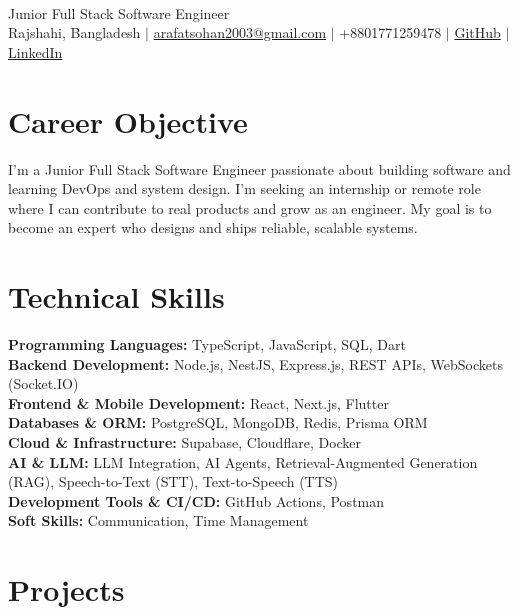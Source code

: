 \documentclass[11pt,a4paper]{article}
\newcommand{\rlink}[2]{\href{#1}{\textcolor{linkblue}{#2}}}
\begin{document}
\begin{center}
  {\LARGE\bfseries{}}\\[4pt]
  Junior Full Stack Software Engineer\\[4pt]
  Rajshahi, Bangladesh $|$ \rlink{mailto:arafatsohan2003@gmail.com}{arafatsohan2003@gmail.com} $|$ +8801771259478 $|$ \rlink{https://github.com/ars2k03}{GitHub} $|$ \rlink{https://www.linkedin.com/in/ars2k05}{LinkedIn}
\end{center}

\section{Career Objective}
I'm a Junior Full Stack Software Engineer passionate about building software and learning DevOps and system design. I'm seeking an internship or remote role where I can contribute to real products and grow as an engineer. My goal is to become an expert who designs and ships reliable, scalable systems.

\section{Technical Skills}
\textbf{Programming Languages:} TypeScript, JavaScript, SQL, Dart\\
\textbf{Backend Development:} Node.js, NestJS, Express.js, REST APIs, WebSockets (Socket.IO)\\
\textbf{Frontend \& Mobile Development:} React, Next.js, Flutter\\
\textbf{Databases \& ORM:} PostgreSQL, MongoDB, Redis, Prisma ORM\\
\textbf{Cloud \& Infrastructure:} Supabase, Cloudflare, Docker\\
\textbf{AI \& LLM:} LLM Integration, AI Agents, Retrieval-Augmented Generation (RAG), Speech-to-Text (STT), Text-to-Speech (TTS)\\
\textbf{Development Tools \& CI/CD:} GitHub Actions, Postman\\
\textbf{Soft Skills:} Communication, Time Management

\section{Projects}
\end{document}
